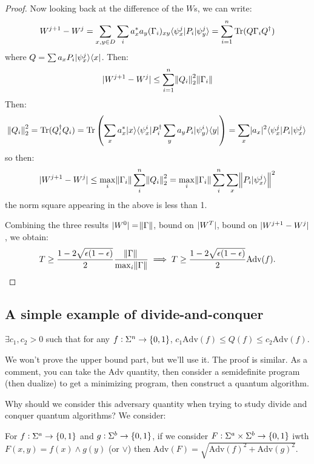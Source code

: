 \begin{proof}
    Now looking back at the difference of the $W$s, we can write:
    \begin{equation}
        W^{j+1} - W^j = \sum_{x, y \in D}\sum_i a_x^*a_y 
        (\Gamma_i)_{xy}\langle \psi_x^j \rvert P_i\lvert \psi_y^j \rangle = \sum_{i=1}^n\mathrm{Tr}(Q\Gamma_iQ^\dagger)
    \end{equation}
    where $Q = \sum a_xP_i\lvert \psi_x^j \rangle \langle x \rvert$. Then:
    \begin{equation}
        \lvert W^{j+1}-W^j \rvert \leq \sum_{i=1}^n \norm{Q_i}^2_2\norm{\Gamma_i}
    \end{equation}
    Then:
    \begin{equation}
        \norm{Q_i}^2_2 = \mathrm{Tr}(Q_i^\dagger Q_i) = \mathrm{Tr}\left(\sum_x a_x^*\lvert x \rangle \langle \psi_x^i \rvert P_i^\dagger \sum_y a_yP_i\lvert \psi_y^i \rangle \langle y \rvert\right) = \sum_x \lvert a_x \rvert^2 \langle \psi_x^j \rvert P_i\lvert \psi_x^j \rangle
    \end{equation}
    so then:
    \begin{equation}
        \lvert W^{j+1}-W^j \rvert \leq \max_i \norm{\Gamma_i}\sum_i^n \norm{Q_i}_2^2 = \max_i \norm{\Gamma_i}\sum_i^n\sum_x\norm{P_i\lvert \psi_x^j \rangle}^2
    \end{equation}
    the norm square appearing in the above is less than 1.

    Combining the three results $\lvert W^0 \rvert = \norm{\Gamma}$, bound on $\lvert W^T \rvert$, bound on $\lvert W^{j+1}-W^j \rvert$, we obtain:
    \begin{equation}
        T \geq \frac{1-2\sqrt{\epsilon(1-\epsilon)}}{2}\frac{\norm{\Gamma}}{\max_i\norm{\Gamma}} \implies T \geq \frac{1-2\sqrt{\epsilon(1-\epsilon)}}{2}\text{Adv}(f).
    \end{equation}
\end{proof}

\subsection*{A simple example of divide-and-conquer}
\begin{propbox}{}
    $\exists c_1, c_2 > 0$ such that for any $f: \Sigma^n \to \set{0, 1}$, $c_1\text{Adv}(f) \leq Q(f) \leq c_2\text{Adv}(f)$. 
\end{propbox}
We won't prove the upper bound part, but we'll use it. The proof is similar. As a comment, you can take the $\text{Adv}$ quantity, then consider a semidefinite program (then dualize) to get a minimizing program, then construct a quantum algorithm.

Why should we consider this adversary quantity when trying to study divide and conquer quantum algorithms? We consider:
\begin{factbox}{}
    For $f: \Sigma^a \to \set{0, 1}$ and $g: \Sigma^b \to \set{0, 1}$, if we consider $F: \Sigma^a \times \Sigma^b \to \set{0, 1}$ iwth $F(x, y) = f(x) \land g(y)$ (or $\lor$) then $\text{Adv}(F) = \sqrt{\text{Adv}(f)^2 + \text{Adv}(g)^2}$.
\end{factbox}

